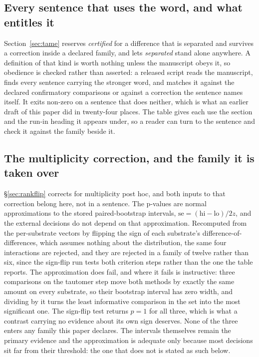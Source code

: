 \subsection{Every sentence that uses the word, and what entitles it}
\label{app:claimwords}

Section~\ref{sec:tame} reserves \emph{certified} for a difference that is separated and survives a
correction inside a declared family, and lets \emph{separated} stand alone anywhere. A definition
of that kind is worth nothing unless the manuscript obeys it, so obedience is checked rather than
asserted: a released script reads the manuscript, finds every sentence carrying the stronger
word, and matches it against the declared confirmatory comparisons or against a correction the
sentence names itself. It exits non-zero on a sentence that does neither, which is what an earlier
draft of this paper did in twenty-four places. The table gives each use the section and the run-in
heading it appears under, so a reader can turn to the sentence and check it against the family
beside it.



\subsection{The multiplicity correction, and the family it is taken over}
\label{app:holm}

\S\ref{sec:rankflip} corrects for multiplicity post hoc, and both inputs to that correction belong
here, not in a sentence. The p-values are normal approximations to the stored paired-bootstrap
intervals, $\mathrm{se}=(\mathrm{hi}-\mathrm{lo})/2z$, and the external decisions do not depend on
that approximation. Recomputed from the per-substrate vectors by flipping the sign of each
substrate's difference-of-differences, which assumes nothing about the distribution, the same four
interactions are rejected, and they are rejected in a family of twelve rather than six, since the
sign-flip run tests both criterion steps rather than the one the table reports. The approximation
does fail, and where it fails is instructive: three comparisons on the tautomer step move both
methods by exactly the same amount on every substrate, so their bootstrap interval has zero width,
and dividing by it turns the least informative comparison in the set into the most significant one.
The sign-flip test returns $p=1$ for all three, which is what a contrast carrying no evidence about
its own sign deserves. None of the three enters any family this paper declares. The intervals
themselves remain the primary
evidence and the approximation is adequate only because most decisions sit far from their threshold: the one that does not is stated as such below.

